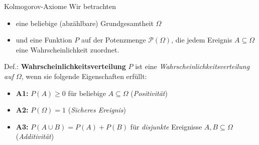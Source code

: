 \documentclass[
  10pt,
  ignorenonframetext,
]{beamer}
\providecommand{\tightlist}{%
  \setlength{\itemsep}{0pt}\setlength{\parskip}{0pt}}
\begin{document}
\begin{frame}{Kolmogorov-Axiome}
\protect\hypertarget{kolmogorov-axiome}{}
Wir betrachten

\begin{itemize}
\tightlist
\item
  eine beliebige (abzählbare) Grundgesamtheit \(\Omega\)
\item
  und eine Funktion \(P\) auf der Potenzmenge \({\mathcal P}(\Omega)\),
  die jedem Ereignis \(A \subseteq \Omega\) eine Wahrscheinlichkeit
  zuordnet.
\end{itemize}

\begin{block}{Def.: \textbf{Wahrscheinlichkeitsverteilung}}
\protect\hypertarget{def.-wahrscheinlichkeitsverteilung}{}
\(P\) ist eine \emph{Wahrscheinlichkeitsverteilung auf \(\Omega\)}, wenn
sie folgende Eigenschaften erfüllt:

\begin{itemize}
\tightlist
\item
  \textbf{A1:} \(P(A)\geq 0\) \quad für beliebige \(A \subseteq \Omega\)
  (\emph{Positivität})
\item
  \textbf{A2:} \(P(\Omega) = 1\) (\emph{Sicheres Ereignis})
\item
  \textbf{A3:} \(P(A \cup B) = P(A) + P(B)\) für \emph{disjunkte}
  Ereignisse \(A,B \subseteq \Omega\) (\emph{Additivität})
\end{itemize}
\end{block}
\end{frame}
\end{document}
